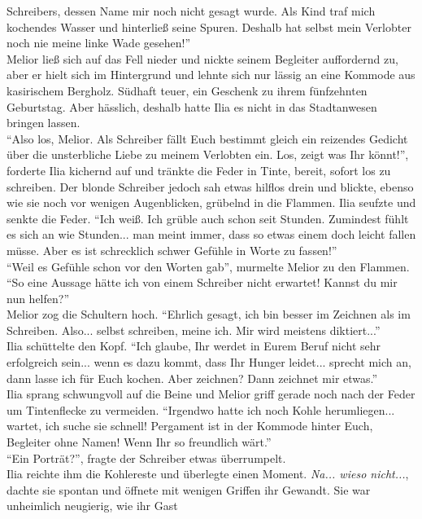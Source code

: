 Schreibers, dessen Name mir noch nicht gesagt wurde. Als Kind traf mich kochendes Wasser und 
hinterließ seine Spuren. Deshalb hat selbst mein Verlobter noch nie meine linke Wade gesehen!''\\
Melior ließ sich auf das Fell nieder und nickte seinem Begleiter auffordernd zu, aber er hielt sich 
im Hintergrund und lehnte sich nur lässig an eine Kommode aus kasirischem Bergholz. Südhaft teuer, 
ein Geschenk zu ihrem fünfzehnten Geburtstag. Aber hässlich, deshalb hatte Ilia es nicht in das 
Stadtanwesen bringen lassen.\\
``Also los, Melior. Als Schreiber fällt Euch bestimmt gleich ein reizendes Gedicht über die 
unsterbliche Liebe zu meinem Verlobten ein. Los, zeigt was Ihr könnt!'', forderte Ilia kichernd auf 
und tränkte die Feder in Tinte, bereit, sofort los zu schreiben. Der blonde Schreiber jedoch sah 
etwas hilflos drein und blickte, ebenso wie sie noch vor wenigen Augenblicken, grübelnd in die 
Flammen. Ilia seufzte und senkte die Feder. ``Ich weiß. Ich grüble auch schon seit Stunden. 
Zumindest fühlt es sich an wie Stunden... man meint immer, dass so etwas einem doch leicht fallen 
müsse. Aber es ist schrecklich schwer Gefühle in Worte zu fassen!'' \\
``Weil es Gefühle schon vor den Worten gab'', murmelte Melior zu den Flammen.\\
``So eine Aussage hätte ich von einem Schreiber nicht erwartet! Kannst du mir nun helfen?''\\
Melior zog die Schultern hoch. ``Ehrlich gesagt, ich bin besser im Zeichnen als im Schreiben. 
Also... selbst schreiben, meine ich. Mir wird meistens diktiert...''\\
Ilia schüttelte den Kopf. ``Ich glaube, Ihr werdet in Eurem Beruf nicht sehr erfolgreich sein... 
wenn es dazu kommt, dass Ihr Hunger leidet... sprecht mich an, dann lasse ich für Euch kochen. Aber 
zeichnen? Dann zeichnet mir etwas.''\\
Ilia sprang schwungvoll auf die Beine und Melior griff gerade noch nach der Feder um Tintenflecke 
zu vermeiden. ``Irgendwo hatte ich noch Kohle herumliegen... wartet, ich suche sie schnell! 
Pergament ist in der Kommode hinter Euch, Begleiter ohne Namen! Wenn Ihr so freundlich wärt.''\\
``Ein Porträt?'', fragte der Schreiber etwas überrumpelt.\\
Ilia reichte ihm die Kohlereste und überlegte einen Moment. \textit{Na... wieso nicht...}, dachte 
sie spontan und öffnete mit wenigen Griffen ihr Gewandt. Sie war unheimlich neugierig, wie ihr Gast 
